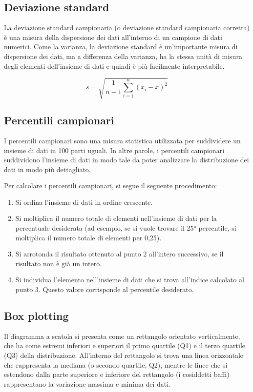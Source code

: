 \subsection{Deviazione standard}

La deviazione standard campionaria (o deviazione standard campionaria corretta) è una misura della dispersione dei dati all'interno di un campione di dati numerici. Come la varianza, la deviazione standard è un'importante misura di dispersione dei dati, ma a differenza della varianza, ha la stessa unità di misura degli elementi dell'insieme di dati e quindi è più facilmente interpretabile.

\begin{equation}
  s = \sqrt{\frac{1}{n-1} \sum_{i=1}^n (x_i - \bar{x})^2}
\end{equation}

\subsection{Percentili campionari}
I percentili campionari sono una misura statistica utilizzata per suddividere un insieme di dati in 100 parti uguali. In altre parole, i percentili campionari suddividono l'insieme di dati in modo tale da poter analizzare la distribuzione dei dati in modo più dettagliato.

Per calcolare i percentili campionari, si segue il seguente procedimento:
\begin{enumerate}
    \item Si ordina l'insieme di dati in ordine crescente.

    \item Si moltiplica il numero totale di elementi nell'insieme di dati per la percentuale desiderata (ad esempio, se si vuole trovare il 25° percentile, si moltiplica il numero totale di elementi per 0,25).

    \item Si arrotonda il risultato ottenuto al punto 2 all'intero successivo, se il risultato non è già un intero.

    \item Si individua l'elemento nell'insieme di dati che si trova all'indice calcolato al punto 3. Questo valore corrisponde al percentile desiderato.

\end{enumerate}

\subsection{Box plotting}
Il diagramma a scatola si presenta come un rettangolo orientato verticalmente, che ha come estremi inferiori e superiori il primo quartile (Q1) e il terzo quartile (Q3) della distribuzione. All'interno del rettangolo si trova una linea orizzontale che rappresenta la mediana (o secondo quartile, Q2), mentre le linee che si estendono dalla parte superiore e inferiore del rettangolo (i cosiddetti baffi) rappresentano la variazione massima e minima dei dati.

